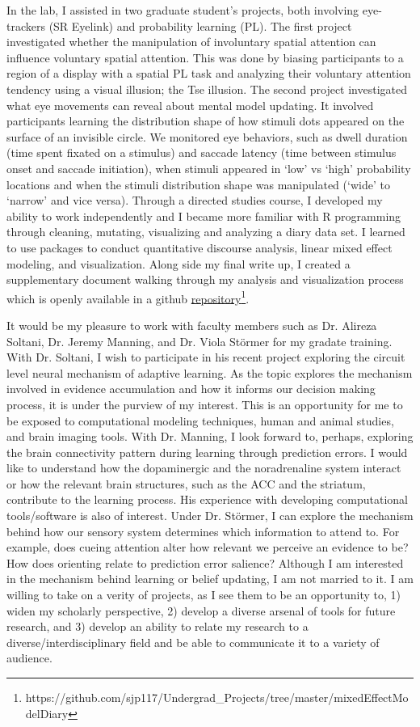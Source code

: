 \documentclass[12pt]{article}
\begin{document}
	In the lab, I assisted in two graduate student's projects, both involving eye-trackers (SR Eyelink) and probability learning (PL). The first project investigated whether the manipulation of involuntary spatial attention can influence voluntary spatial attention. This was done by biasing participants to a region of a display with a spatial PL task and analyzing their voluntary attention tendency using a visual illusion; the Tse illusion. The second project investigated what eye movements can reveal about mental model updating. It involved participants learning the distribution shape of how stimuli dots appeared on the surface of an invisible circle. We monitored eye behaviors, such as dwell duration (time spent fixated on a stimulus) and saccade latency (time between stimulus onset and saccade initiation), when stimuli appeared in `low' vs `high' probability locations and when the stimuli distribution shape was manipulated (`wide' to `narrow' and vice versa). Through a directed studies course, I developed my ability to work independently and I became more familiar with R programming through cleaning, mutating, visualizing and analyzing a diary data set. I learned to use packages to conduct quantitative discourse analysis, linear mixed effect modeling, and visualization. Along side my final write up, I created a supplementary document walking through my analysis and visualization process which is openly available in a github \href{https://github.com/sjp117/Undergrad_Projects/tree/master/mixedEffectModelDiary}{repository}\footnote{https://github.com/sjp117/Undergrad\_Projects/tree/master/mixedEffectModelDiary}.
	
	It would be my pleasure to work with faculty members such as Dr. Alireza Soltani, Dr. Jeremy Manning, and Dr. Viola Störmer for my gradate training. With Dr. Soltani, I wish to participate in his recent project exploring the circuit level neural mechanism of adaptive learning. As the topic explores the mechanism involved in evidence accumulation and how it informs our decision making process, it is under the purview of my interest. This is an opportunity for me to be exposed to computational modeling techniques, human and animal studies, and brain imaging tools. With Dr. Manning, I look forward to, perhaps, exploring the brain connectivity pattern during learning through prediction errors. I would like to understand how the dopaminergic and the noradrenaline system interact or how the relevant brain structures, such as the ACC and the striatum, contribute to the learning process. His experience with developing computational tools/software is also of interest. Under Dr. Störmer, I can explore the mechanism behind how our sensory system determines which information to attend to. For example, does cueing attention alter how relevant we perceive an evidence to be? How does orienting relate to prediction error salience? Although I am interested in the mechanism behind learning or belief updating, I am not married to it. I am willing to take on a verity of projects, as I see them to be an opportunity to, 1) widen my scholarly perspective, 2) develop a diverse arsenal of tools for future research, and 3) develop an ability to relate my research to a diverse/interdisciplinary field and be able to communicate it to a variety of audience.
	
\end{document}
